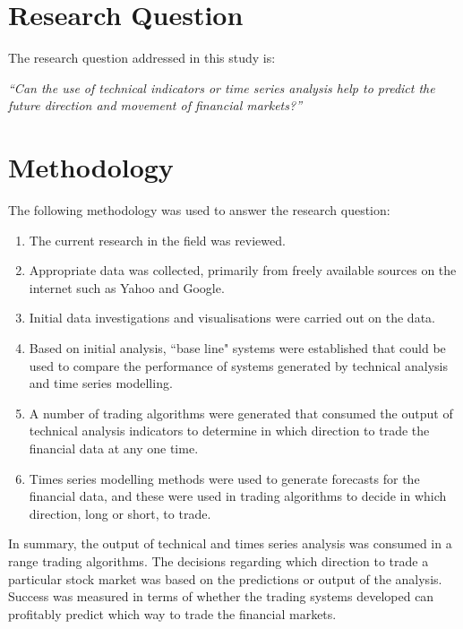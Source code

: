 

\section{Research Question}
The research question addressed in this study is: 

\textit{\textquotedblleft Can the use of technical indicators or time series analysis help to predict the future direction and movement of financial markets?\textquotedblright}

\section{Methodology}
The following methodology was used to answer the research question:

\begin{enumerate}
\item The current research in the field was reviewed.
\item Appropriate data was collected, primarily from freely available sources on the internet such as Yahoo and Google.
\item Initial data investigations and visualisations were carried out on the data.
\item Based on initial analysis, \textquotedblleft base line" systems were established that could be used to compare the performance of systems generated by technical analysis and time series modelling.
\item A number of trading algorithms were generated that consumed the output of technical analysis indicators to determine in which direction to trade the financial data at any one time.
\item Times series modelling methods were used to generate forecasts for the financial data, and these were used in trading algorithms to decide in which direction, long or short, to trade.
\end{enumerate}

In summary, the output of technical and times series analysis was consumed in a range trading algorithms. The decisions regarding which direction to trade a particular stock market was based on the predictions or output of the analysis. Success was measured in terms of whether the trading systems developed can profitably predict which way to trade the financial markets.

